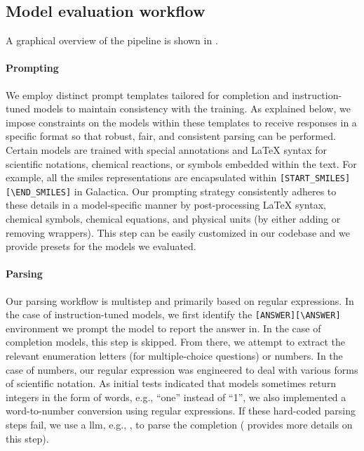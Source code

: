 \documentclass[11pt, oneside]{article}
\begin{document}
\begin{refsection}
\subsection{Model evaluation workflow}
A graphical overview of the pipeline is shown in .

\paragraph{Prompting}

We employ distinct prompt templates tailored for completion and instruction-tuned models to maintain consistency with the training.
As explained below, we impose constraints on the models within these templates to receive responses in a specific format so that robust, fair, and consistent parsing can be performed.
Certain models are trained with special annotations and \LaTeX\xspace syntax for scientific notations, chemical reactions, or symbols embedded within the text.
For example, all the \gls{smiles} representations are encapsulated within \texttt{[START\_SMILES][\textbackslash END\_SMILES]} in Galactica\autocite{taylor2022galactica}.
Our prompting strategy consistently adheres to these details in a model-specific manner by post-processing \LaTeX\xspace syntax, chemical symbols, chemical equations, and physical units (by either adding or removing wrappers).
This step can be easily customized in our codebase and we provide presets for the models we evaluated.



\paragraph{Parsing}
Our parsing workflow is multistep and primarily based on regular expressions.
In the case of instruction-tuned models, we first identify the \texttt{[ANSWER]}\texttt{[\textbackslash ANSWER]} environment we prompt the model to report the answer in.
In the case of completion models, this step is skipped. From there, we attempt to extract the relevant enumeration letters (for multiple-choice questions) or numbers.
In the case of numbers, our regular expression was engineered to deal with various forms of scientific notation.
As initial tests indicated that models sometimes return integers in the form of words, e.g., \enquote{one} instead of \enquote{1}, we also implemented a word-to-number conversion using regular expressions.
If these hard-coded parsing steps fail, we use a \gls{llm}, e.g., \ClaudeThreeFiveSonnet, to parse the completion ( provides more details on this step).



\end{refsection}
\end{document}
